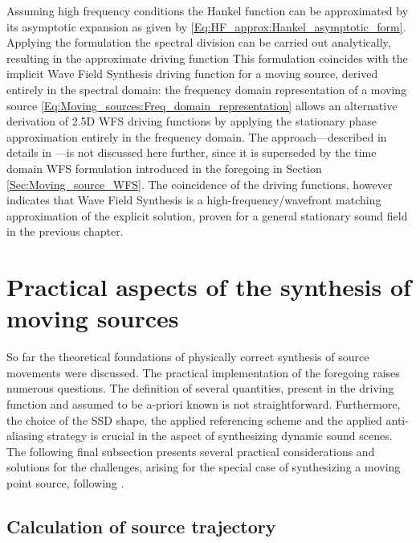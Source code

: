 Assuming high frequency conditions the Hankel function can be approximated by its asymptotic expansion as given by \eqref{Eq:HF_approx:Hankel_asymptotic_form}.
Applying the formulation the spectral division can be carried out analytically, resulting in the approximate driving function
This formulation coincides with the implicit Wave Field Synthesis driving function for a moving source, derived entirely in the spectral domain: 
the frequency domain representation of a moving source \eqref{Eq:Moving_sources:Freq_domain_representation} allows an alternative derivation of 2.5D WFS driving functions by applying the stationary phase approximation entirely in the frequency domain.
The approach---described in details in \cite{firtha2015sound}---is not discussed here further, since it is superseded by the time domain WFS formulation introduced in the foregoing in Section \ref{Sec:Moving_source_WFS}.
The coincidence of the driving functions, however indicates that Wave Field Synthesis is a high-frequency/wavefront matching approximation of the explicit solution, proven for a general stationary sound field in the previous chapter.

\section{Practical aspects of the synthesis of moving sources}

So far the theoretical foundations of physically correct synthesis of source movements were discussed.
The practical implementation of the foregoing raises numerous questions.
The definition of several quantities, present in the driving function and assumed to be a-priori known is not straightforward.
Furthermore, the choice of the SSD shape, the applied referencing scheme and the applied anti-aliasing strategy is crucial in the aspect of synthesizing dynamic sound scenes.
The following final subsection presents several practical considerations and solutions for the challenges, arising for the special case of synthesizing a moving point source, following \cite{Firtha2018_daga_moving_source}.

\subsection{Calculation of source trajectory}
\label{Sec:Trajectory_calc}


